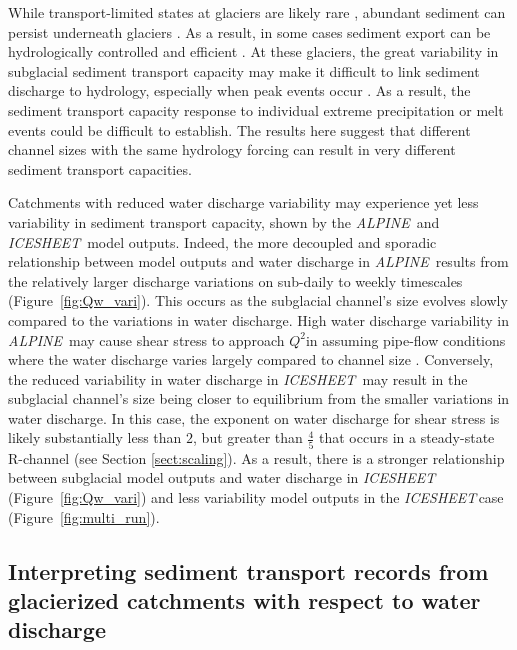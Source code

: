 \documentclass[esurf, manuscript]{copernicus}
\newcommand{\alpine}{\textit{ALPINE}\,}
\newcommand{\icesheet}{\textit{ICESHEET}\,}
\begin{document}
While transport-limited states at glaciers are likely rare \citep[e.g.][]{alley1997}, abundant sediment can persist underneath glaciers \citep[e.g.][]{walter2014,stevens2022,delaney2022}.
As a result, in some cases sediment export can be hydrologically controlled and efficient \citep[e.g.][]{swift2005,andresen2024}.
At these glaciers, the great variability in subglacial sediment transport capacity may make it difficult to link sediment discharge to hydrology, especially when peak events occur \citep{cowan1988,delaney2018,lu2022}.
As a result, the sediment transport capacity response to individual extreme precipitation or melt events could be difficult to establish.
The results here suggest that different channel sizes with the same hydrology forcing can result in very different sediment transport capacities. 

Catchments with reduced water discharge variability may experience yet less variability in sediment transport capacity, shown by the \alpine{} and \icesheet{} model outputs.
Indeed, the more decoupled and sporadic relationship between model outputs and water discharge in \alpine{} results from the relatively larger discharge variations on sub-daily to weekly timescales (Figure~\ref{fig:Qw_vari}).
This occurs as the subglacial channel's size evolves slowly compared to the variations in water discharge.
High water discharge variability in \alpine{} may cause shear stress to approach $Q^{2}$in assuming pipe-flow conditions where the water discharge varies largely compared to channel size \citep[Section \ref{sect:scaling}; c.f.][]{alley1997}.
Conversely, the reduced variability in water discharge in \icesheet{} may result in the subglacial channel's size being closer to equilibrium from the smaller variations in water discharge.
In this case, the exponent on water discharge for shear stress is likely substantially less than $2$, but greater than $\frac{4}{5}$ that occurs in a steady-state R-channel (see Section \ref{sect:scaling}).
As a result, there is a stronger relationship between subglacial model outputs and water discharge in \icesheet{} (Figure~\ref{fig:Qw_vari}) and less variability model outputs in the \icesheet case (Figure~\ref{fig:multi_run}).

\subsection{Interpreting sediment transport records from glacierized catchments with respect to water discharge}
\end{document}
